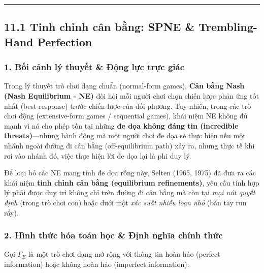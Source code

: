 \documentclass[
]{article}
\begin{document}
\begin{center}\rule{0.5\linewidth}{0.5pt}\end{center}

\subsection{11.1 Tinh chỉnh cân bằng: SPNE \& Trembling-Hand
Perfection}\label{tinh-chux1ec9nh-cuxe2n-bux1eb1ng-spne-trembling-hand-perfection}

\subsubsection{1. Bối cảnh lý thuyết \& Động lực trực
giác}\label{bux1ed1i-cux1ea3nh-luxfd-thuyux1ebft-ux111ux1ed9ng-lux1ef1c-trux1ef1c-giuxe1c}

Trong lý thuyết trò chơi dạng chuẩn (normal-form games), \textbf{Cân
bằng Nash (Nash Equilibrium - NE)} đòi hỏi mỗi người chơi chọn chiến
lược phản ứng tốt nhất (best response) trước chiến lược của đối phương.
Tuy nhiên, trong các trò chơi động (extensive-form games / sequential
games), khái niệm NE không đủ mạnh vì nó cho phép tồn tại những
\textbf{đe dọa không đáng tin (incredible threats)}---những hành động mà
một người chơi đe dọa sẽ thực hiện nếu một nhánh ngoài đường đi cân bằng
(off-equilibrium path) xảy ra, nhưng thực tế khi rơi vào nhánh đó, việc
thực hiện lời đe dọa lại là phi duy lý.

Để loại bỏ các NE mang tính đe dọa rỗng này, Selten (1965, 1975) đã đưa
ra các khái niệm \textbf{tinh chỉnh cân bằng (equilibrium refinements)},
yêu cầu tính hợp lý phải được duy trì không chỉ trên đường đi cân bằng
mà còn tại \emph{mọi nút quyết định} (trong trò chơi con) hoặc dưới một
\emph{xác suất nhiễu loạn nhỏ} (bàn tay run rẩy).

\subsubsection{2. Hình thức hóa toán học \& Định nghĩa chính
thức}\label{huxecnh-thux1ee9c-huxf3a-touxe1n-hux1ecdc-ux111ux1ecbnh-nghux129a-chuxednh-thux1ee9c}

Gọi \(\Gamma_E\) là một trò chơi dạng mở rộng với thông tin hoàn hảo
(perfect information) hoặc không hoàn hảo (imperfect information).
\end{document}
